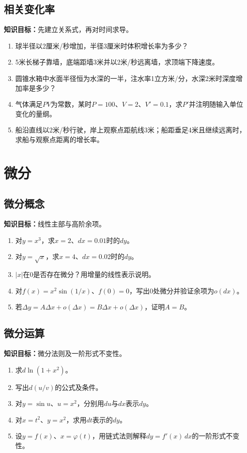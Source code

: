 \documentclass[11pt,a4paper,fontset=fandol]{ctexrep}
\newcommand{\goal}[1]{\textbf{知识目标：}#1\par}
\begin{document}
\subsection{相关变化率}
\goal{先建立关系式，再对时间求导。}
\begin{enumerate}
\item 球半径以2厘米/秒增加，半径3厘米时体积增长率为多少？
\item 5米长梯子靠墙，底端距墙3米并以2米/秒远离墙，求顶端下降速度。
\item 圆锥水箱中水面半径恒为水深的一半，注水率1立方米/分，水深2米时深度增加率是多少？
\item 气体满足$PV$为常数，某时$P=100$、$V=2$、$V'=0.1$，求$P'$并注明随输入单位变化的量纲。
\item 船沿直线以2米/秒行驶，岸上观察点距航线3米；船距垂足4米且继续远离时，求船与观察点距离的增长率。
\end{enumerate}
\section{微分}
\subsection{微分概念}
\goal{线性主部与高阶余项。}
\begin{enumerate}
\item 对$y=x^3$，求$x=2$、$dx=0.01$时的$dy$。
\item 对$y=\sqrt x$，求$x=4$、$dx=0.02$时的$dy$。
\item $|x|$在0是否存在微分？用增量的线性表示说明。
\item 对$f(x)=x^2\sin(1/x)$、$f(0)=0$，写出0处微分并验证余项为$o(dx)$。
\item 若$\Delta y=A\Delta x+o(\Delta x)=B\Delta x+o(\Delta x)$，证明$A=B$。
\end{enumerate}
\subsection{微分运算}
\goal{微分法则及一阶形式不变性。}
\begin{enumerate}
\item 求$d\ln(1+x^2)$。
\item 写出$d(u/v)$的公式及条件。
\item 对$y=\sin u$、$u=x^2$，分别用$du$与$dx$表示$dy$。
\item 对$x=t^2$、$y=x^2$，求用$dt$表示的$dy$。
\item 设$y=f(x)$、$x=\varphi(t)$，用链式法则解释$dy=f'(x)\,dx$的一阶形式不变性。
\end{enumerate}
\end{document}
